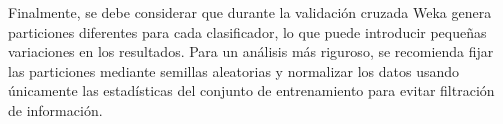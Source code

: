 \documentclass{article}
\begin{document}
\newpage

Finalmente, se debe considerar que durante la validación cruzada Weka genera particiones diferentes para cada clasificador, lo que puede introducir pequeñas variaciones en los resultados. Para un análisis más riguroso, se recomienda fijar las particiones mediante semillas aleatorias y normalizar los datos usando únicamente las estadísticas del conjunto de entrenamiento para evitar filtración de información.\\




\end{document}
